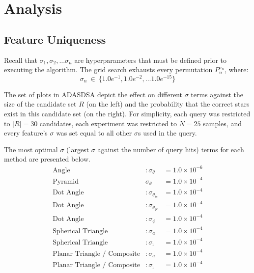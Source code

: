 \section{Analysis}\label{sec:analysis}

\subsection{Feature Uniqueness}\label{subsec:featureUniquenessAnalysis}
Recall that $\sigma_1, \sigma_2, \ldots \sigma_n$ are hyperparameters that must be defined prior to executing the
algorithm.
The grid search exhausts every permutation $P_n^{\sigma_n}$, where:
\begin{equation}
    \label{eq:gridSearchEpsilon}
    \sigma_n \ \in \ \{1.0e^{-1}, 1.0e^{-2}, \ldots 1.0e^{-15}\}
\end{equation}

The set of plots in ADASDSA depict the effect on different $\sigma$ terms against the size of the candidate set $R$
(on the left) and the probability that the correct stars exist in this candidate set (on the right).
For simplicity, each query was restricted to $|R|=30$ candidates, each experiment was restricted to $N=25$ samples, and
every feature's $\sigma$ was set equal to all other $\sigma$s used in the query.

The most optimal $\sigma$ (largest $\sigma$ against the number of query hits) terms for each method are presented
below.
\begin{align*}
    \text{Angle}&: \sigma_\theta &= 1.0 \times 10^{-6}\\
    \text{Pyramid}& \sigma_\theta &= 1.0 \times 10^{-4}\\
    \text{Dot Angle}&: \sigma_{\theta_{ic}} &= 1.0 \times 10^{-4}\\
    \text{Dot Angle}&: \sigma_{\theta_{jc}} &= 1.0 \times 10^{-4}\\
    \text{Dot Angle}&: \sigma_\phi &= 1.0 \times 10^{-4} \\
    \text{Spherical Triangle}&: \sigma_a &= 1.0 \times 10^{-4}\\
    \text{Spherical Triangle}&: \sigma_\imath &= 1.0 \times 10^{-4}\\
    \text{Planar Triangle / Composite}&: \sigma_a &= 1.0 \times 10^{-4} \\
    \text{Planar Triangle / Composite}&: \sigma_\imath &= 1.0 \times 10^{-4}\\
\end{align*}

